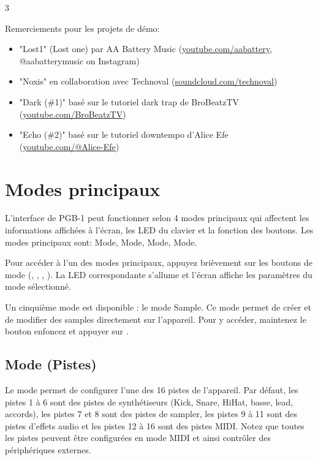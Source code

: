 \documentclass[8pt]{extarticle}
\def\device{PGB-1 }
\begin{document}
\begin{multicols*}{3}
\hfill

Remerciements pour les projets de démo:
\begin{itemize}
    \item "Lost1" (Lost one) par AA Battery Music (\url{youtube.com/aabattery}, @aabatterymusic on Instagram)
    \item "Noxis" en collaboration avec Technoval (\url{soundcloud.com/technoval})
    \item "Dark (\#1)" basé sur le tutoriel dark trap de BroBeatzTV (\url{youtube.com/BroBeatzTV})
    \item "Echo (\#2)" basé sur le tutoriel downtempo d’Alice Efe (\url{youtube.com/@Alice-Efe})
\end{itemize}

\section{Modes principaux}

L’interface de \device peut fonctionner selon 4 modes principaux qui affectent les informations affichées à l’écran, les LED du clavier et la fonction des boutons.
Les modes principaux sont:  Mode,  Mode,  Mode,  Mode.

Pour accéder à l'un des modes principaux, appuyez brièvement sur les boutons de mode (, , , ). La LED correspondante s'allume et l'écran affiche les paramètres du mode sélectionné.

\begin{notes}
    \item Un cinquième mode est disponible : le mode Sample. Ce mode permet de créer et de modifier des samples directement sur l'appareil. Pour y accéder, maintenez le bouton  enfoncez et appuyer sur .
\end{notes}

\subsection{ Mode (Pistes)}

Le mode  permet de configurer l'une des 16 pistes de l'appareil. Par défaut, les pistes 1 à 6 sont des pistes de synthétiseurs (Kick, Snare, HiHat, basse, lead, accords), les pistes 7 et 8 sont des pistes de sampler, les pistes 9 à 11 sont des pistes d'effets audio et les pistes 12 à 16 sont des pistes MIDI. Notez que toutes les pistes peuvent être configurées en mode MIDI et ainsi contrôler des périphériques externes.


\end{multicols*}
\end{document}
